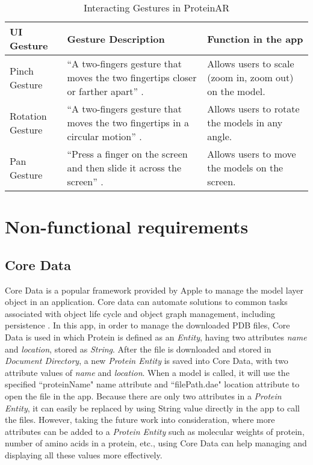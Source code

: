 \begin{table}[h!]
\centering
\begin{tabularx}{\textwidth} {
  | >{\raggedright\arraybackslash}X 
  | >{\raggedright\arraybackslash}X 
  | >{\raggedright\arraybackslash}X | }
\hline
UI Gesture & Gesture Description & Function in the app \\
\hline
\hline
Pinch Gesture & “A two-fingers gesture that moves the two fingertips closer or farther apart” \parencite{wang_beginning_2018}. & Allows users to scale (zoom in, zoom out) on the model. \\
\hline
Rotation Gesture & “A two-fingers gesture that moves the two fingertips in a circular motion” \parencite{wang_beginning_2018}. & Allows users to rotate the models in any angle. \\
\hline
Pan Gesture & “Press a finger on the screen and then slide it across the screen” \parencite{wang_beginning_2018}. & Allows users to move the models on the screen. \\
\hline
\end{tabularx}
\caption {Interacting Gestures in ProteinAR}
\label{tab:gesture}
\end{table}


\section{Non-functional requirements}
\subsection{Core Data}
Core Data is a popular framework provided by Apple to manage the model layer object in an application. 
Core data can automate solutions to common tasks associated with object life cycle and object graph management, including persistence \parencite{noauthor_core_nodate}. In this app, in order to manage the downloaded PDB files, Core Data is used in which Protein is defined as an \emph{Entity}, having two attributes \emph{name} and \emph{location}, stored as \emph{String}. After the file is downloaded and stored in \emph{Document Directory}, a new \emph{Protein Entity} is saved into Core Data, with two attribute values of \emph{name} and \emph{location}. When a model is called, it will use the specified ``proteinName" name attribute and ``filePath.dae" location attribute to open the file in the app. 
Because there are only two attributes in a \emph{Protein Entity}, it can easily be replaced by using String value directly in the app to call the files. However, taking the future work into consideration, where more attributes can be added to a \emph{Protein Entity} such as molecular weights of protein, number of amino acids in a protein, etc., using Core Data can help managing and displaying all these values more effectively.

